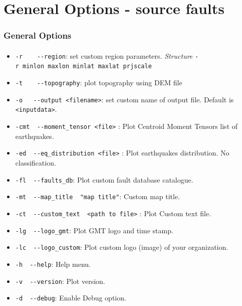\section[General arg]{General Options - source faults}

\graphicspath{{Chapter4/Figs/}{Figs/}}
\begin{frame}
  \frametitle{General Options}
  \framesubtitle{}
  \label{ch4fr:genopt}
\begin{scriptsize}
\begin{itemize}
\item
  \texttt{-r\ \ \ \textbar{}\ -\/-region}: set custom region parameters.
  \emph{Structure} \texttt{-r\ minlon\ maxlon\ minlat\ maxlat\ prjscale}
\item
  \texttt{-t\ \ \ \textbar{}\ -\/-topography}: plot topography using DEM
  file
\item
  \texttt{-o\ \ \textbar{}\ -\/-output\ \textless{}filename\textgreater{}}:
  set custom name of output file. Default is
  \texttt{\textless{}inputdata\textgreater{}}.
\item
  \texttt{-cmt\ \textbar{}\ -\/-moment\_tensor\ \textless{}file\textgreater{}}
  : Plot Centroid Moment Tensors list of earthquakes.
\item
  \texttt{-ed\ \textbar{}\ -\/-eq\_distribution\ \textless{}file\textgreater{}}
  : Plot earthquakes distribution. No classification.
\item
  \texttt{-fl\ \textbar{}\ -\/-faults\_db}: Plot custom fault database
  catalogue.
\item
  \texttt{-mt\ \textbar{}\ -\/-map\_title\ \ "map\ title"}: Custom map
  title.
\item
  \texttt{-ct\ \textbar{}\ -\/-custom\_text\ \ \textless{}path\ to\ file\textgreater{}}
  : Plot Custom text file.
\item
  \texttt{-lg\ \textbar{}\ -\/-logo\_gmt}: Plot GMT logo and time stamp.
\item
  \texttt{-lc\ \textbar{}\ -\/-logo\_custom}: Plot custom logo (image)
  of your organization.
\item
  \texttt{-h\ \textbar{}\ -\/-help}: Help menu.
\item
  \texttt{-v\ \textbar{}\ -\/-version}: Plot version.
\item
  \texttt{-d\ \textbar{}\ -\/-debug}: Enable Debug option.
\end{itemize}
\end{scriptsize}
\end{frame}
\note{}

